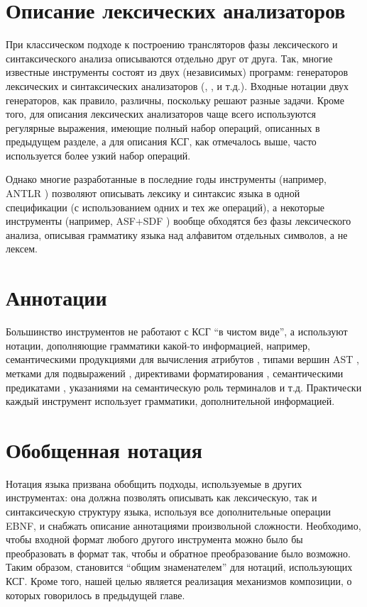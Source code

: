 \section{Описание лексических анализаторов}

При классическом подходе к построению трансляторов \cite{???} фазы лексического и синтаксического анализа описываются отдельно друг от друга. Так, многие известные инструменты состоят из двух (независимых) программ: генераторов лексических и синтаксических анализаторов (, ,  и т.д.). Входные нотации двух генераторов, как правило, различны, поскольку решают разные задачи. Кроме того, для описания лексических анализаторов чаще всего используются регулярные выражения, имеющие полный набор операций, описанных в предыдущем разделе, а для описания КСГ, как отмечалось выше, часто используется более узкий набор операций.

Однако многие разработанные в последние годы инструменты (например, ANTLR \cite{???}) позволяют описывать лексику и синтаксис языка в одной спецификации (с использованием одних и тех же операций), а некоторые инструменты (например, ASF+SDF \cite{???}) вообще обходятся без фазы лексического анализа, описывая грамматику языка над алфавитом отдельных символов, а не лексем.

\section{Аннотации}

Большинство инструментов не работают с КСГ ``в чистом виде'', а используют нотации, дополняющие грамматики какой-то информацией, например, семантическими продукциями для вычисления атрибутов \cite{???}, типами вершин AST \cite{???}, метками для подвыражений \cite{???}, директивами форматирования \cite{???}, семантическими предикатами \cite{???}, указаниями на семантическую роль терминалов \cite{???} и т.д. Практически каждый инструмент использует грамматики,  дополнительной информацией.

\section{Обобщенная нотация}

Нотация языка  призвана обобщить подходы, используемые в других инструментах: она должна позволять описывать как лексическую, так и синтаксическую структуру языка, используя все дополнительные операции EBNF, и снабжать описание аннотациями произвольной сложности. Необходимо, чтобы входной формат любого другого инструмента можно было бы преобразовать в формат  так, чтобы и обратное преобразование было возможно. Таким образом,  становится ``общим знаменателем'' для нотаций, использующих КСГ. Кроме того, нашей целью является реализация механизмов композиции, о которых говорилось в предыдущей главе.

